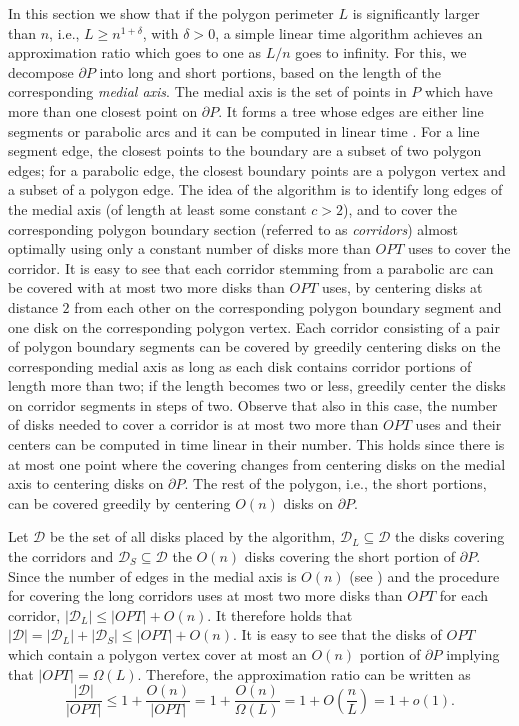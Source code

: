 \documentclass{llncs}
\begin{document}
In this section we show that if the polygon perimeter $L$ is significantly larger than $n$, i.e., $L \geq n^{1 + \delta}$, with $\delta > 0$, a simple linear time algorithm achieves an approximation ratio which goes to one as $L/n$ goes to infinity. For this, we decompose $\partial P$ into long and short portions, based on the length of the corresponding \emph{medial axis}. The medial axis is the set of points in $P$ which have more than one closest point on $\partial P$. It forms a tree whose edges are either line segments or parabolic arcs and it can be computed in linear time \cite{medialAxis}. For a line segment edge, the closest points to the boundary are a subset of two polygon edges; for a parabolic edge, the closest boundary points are a polygon vertex and a subset of a polygon edge.  The idea of the algorithm is to identify long edges of the medial axis (of length at least some constant $c >2$), and to cover the corresponding polygon boundary section (referred to as {\em corridors}) almost optimally using only a constant number of disks more than $OPT$ uses to cover the corridor. It is easy to see that each corridor stemming from a parabolic arc can be covered with at most two more disks than $OPT$ uses, by centering disks at distance $2$ from each other on the corresponding polygon boundary segment and one disk on the corresponding polygon vertex.  Each corridor consisting of a pair of polygon boundary segments can be covered by greedily centering disks on the corresponding medial axis as long as each disk contains corridor portions of length more than two; if the length becomes two or less, greedily center the disks on  corridor segments in steps of two.  Observe that also in this case, the number of disks needed to cover a corridor is at most two more than $OPT$ uses and their centers can be computed in time linear in their number. This holds since there is at most one point where the covering changes from centering disks on the medial axis to centering disks on $\partial P$. The rest of the polygon, i.e., the short portions,  can be covered greedily by centering $O(n)$ disks on $\partial P$.

Let $\mathcal{D}$ be the set of all disks placed by the algorithm, $\mathcal{D}_L \subseteq \mathcal{D}$ the disks covering the corridors and $\mathcal{D}_S \subseteq \mathcal{D}$ the $O(n)$ disks covering the short portion of $\partial P$.  
Since the number of edges in the medial axis is $O(n)$ (see \cite{medialAxis}) and the procedure for covering the long corridors uses at most two more disks than $OPT$ for each corridor, $|\mathcal{D}_L| \leq |OPT| + O(n)$. It therefore holds that $|\mathcal{D}| = |\mathcal{D}_L| + |\mathcal{D}_S| \leq |OPT| + O(n)$. It is easy to see that the disks of $OPT$ which contain a polygon vertex cover at most an $O(n)$ portion of $\partial P$ implying that $|OPT| =  \Omega(L) $.  Therefore, the approximation ratio can be written as
$$\frac{|\mathcal{D}|}{|OPT|} \leq 1 + \frac{O(n)}{|OPT|} = 1 + \frac{O(n)}{\Omega(L)} = 1 + O\left( \frac{n}{L} \right ) = 1 + o\left( 1 \right ).$$ 
\end{document}
